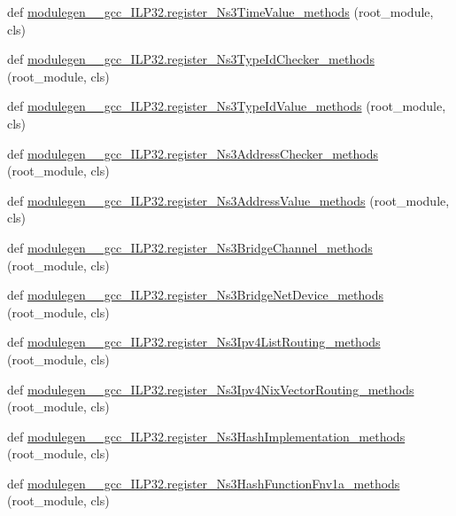 \begin{DoxyCompactItemize}
\item 
def \hyperlink{namespacemodulegen____gcc__ILP32_a1105d61b4c389df61b8b83b0a25cc654}{modulegen\+\_\+\+\_\+gcc\+\_\+\+I\+L\+P32.\+register\+\_\+\+Ns3\+Time\+Value\+\_\+methods} (root\+\_\+module, cls)
\item 
def \hyperlink{namespacemodulegen____gcc__ILP32_a8cc76f23a8cb33ad3a0e4d77e8fbee0a}{modulegen\+\_\+\+\_\+gcc\+\_\+\+I\+L\+P32.\+register\+\_\+\+Ns3\+Type\+Id\+Checker\+\_\+methods} (root\+\_\+module, cls)
\item 
def \hyperlink{namespacemodulegen____gcc__ILP32_a39c112d1c935b295e15786cb622c73a5}{modulegen\+\_\+\+\_\+gcc\+\_\+\+I\+L\+P32.\+register\+\_\+\+Ns3\+Type\+Id\+Value\+\_\+methods} (root\+\_\+module, cls)
\item 
def \hyperlink{namespacemodulegen____gcc__ILP32_a6cddc7786a1240bac0c2c11d2e5e40f3}{modulegen\+\_\+\+\_\+gcc\+\_\+\+I\+L\+P32.\+register\+\_\+\+Ns3\+Address\+Checker\+\_\+methods} (root\+\_\+module, cls)
\item 
def \hyperlink{namespacemodulegen____gcc__ILP32_a73078c37ac27c6fd2ec5e6a012ec4c0d}{modulegen\+\_\+\+\_\+gcc\+\_\+\+I\+L\+P32.\+register\+\_\+\+Ns3\+Address\+Value\+\_\+methods} (root\+\_\+module, cls)
\item 
def \hyperlink{namespacemodulegen____gcc__ILP32_a5401229821d4e15c6f4bc150b3c03796}{modulegen\+\_\+\+\_\+gcc\+\_\+\+I\+L\+P32.\+register\+\_\+\+Ns3\+Bridge\+Channel\+\_\+methods} (root\+\_\+module, cls)
\item 
def \hyperlink{namespacemodulegen____gcc__ILP32_abe9bd4844dd77242f15a79b65021de7e}{modulegen\+\_\+\+\_\+gcc\+\_\+\+I\+L\+P32.\+register\+\_\+\+Ns3\+Bridge\+Net\+Device\+\_\+methods} (root\+\_\+module, cls)
\item 
def \hyperlink{namespacemodulegen____gcc__ILP32_ac834064d9c9cf4a96806bdc806950693}{modulegen\+\_\+\+\_\+gcc\+\_\+\+I\+L\+P32.\+register\+\_\+\+Ns3\+Ipv4\+List\+Routing\+\_\+methods} (root\+\_\+module, cls)
\item 
def \hyperlink{namespacemodulegen____gcc__ILP32_a2a31f4a91c09f46ceab30f364822cc00}{modulegen\+\_\+\+\_\+gcc\+\_\+\+I\+L\+P32.\+register\+\_\+\+Ns3\+Ipv4\+Nix\+Vector\+Routing\+\_\+methods} (root\+\_\+module, cls)
\item 
def \hyperlink{namespacemodulegen____gcc__ILP32_acbacaf626a5a437cc46ab734cfde3cb8}{modulegen\+\_\+\+\_\+gcc\+\_\+\+I\+L\+P32.\+register\+\_\+\+Ns3\+Hash\+Implementation\+\_\+methods} (root\+\_\+module, cls)
\item 
def \hyperlink{namespacemodulegen____gcc__ILP32_a8a8387218e2c3d882054e6b56a6a4b07}{modulegen\+\_\+\+\_\+gcc\+\_\+\+I\+L\+P32.\+register\+\_\+\+Ns3\+Hash\+Function\+Fnv1a\+\_\+methods} (root\+\_\+module, cls)

\end{DoxyCompactItemize}
